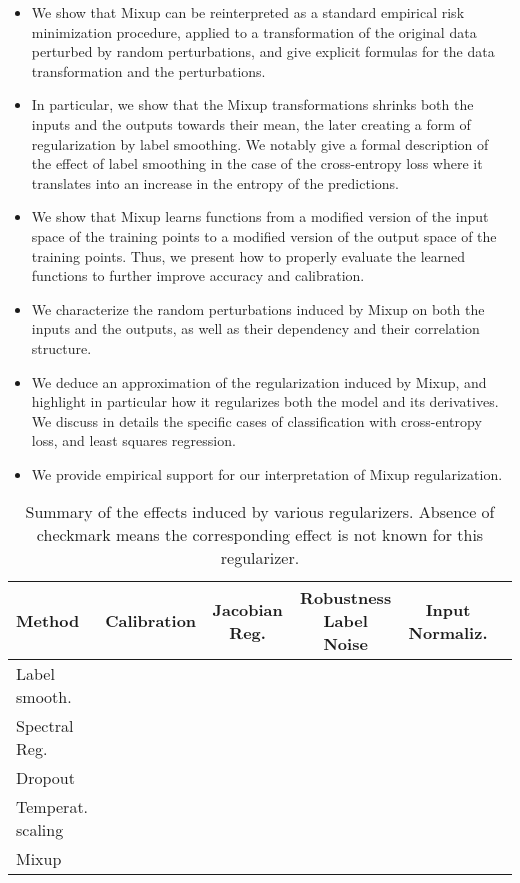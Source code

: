 \documentclass[twoside,11pt]{article}
\newcommand{\nt}[1]{{\bf \color{red} #1}}
\begin{document}
\begin{itemize}\item We show that Mixup can be reinterpreted as a standard empirical risk minimization procedure, applied to a transformation of the original data perturbed by random perturbations, and give explicit formulas for the data transformation and the perturbations.
\item In particular, we show that the Mixup transformations shrinks both the inputs and the outputs towards their mean, the later creating a form of regularization by label smoothing. We notably give a formal description of the effect of label smoothing in the case of the cross-entropy loss where it translates into an increase in the entropy of the predictions.
\item We show that Mixup learns functions from a modified version of the input space of the training points to a modified version of the output space of the training points.
Thus, we present how to properly evaluate the learned functions to further improve accuracy and calibration. 
\item We characterize the random perturbations induced by Mixup on both the inputs and the outputs, as well as their dependency and their correlation structure.
\item We deduce an approximation of the regularization induced by Mixup, and highlight in particular how it regularizes both the model and its derivatives. We discuss in details the specific cases of classification with cross-entropy loss, and least squares regression.
\item We provide empirical support for our interpretation of Mixup regularization.
\end{itemize}


\begin{table}[!htbp]
\begin{center}
\begin{scriptsize}
\setlength\tabcolsep{4pt}
\begin{tabular}{@{}l|c|c|c|c|c|@{}}
\toprule
Method & Calibration  & Jacobian Reg.  & Robustness Label Noise  & Input Normaliz.  \\
\midrule
Label smooth.~\citep{szegedy2016rethinking}       &             &   &     &    \\
Spectral Reg.~\citep{cisse2017parseval}   &           &             &      &\\
Dropout~\citep{wager2013dropout}       &   &    &      &      \\
Temperat. scaling~\citep{guo2017calibration} &    &   &    & \\
Mixup~\citep{Zhang2018mixup} &    &   &      & \\
\bottomrule
\end{tabular}
\end{scriptsize}
\end{center}
\caption{Summary of the effects induced by various regularizers. Absence of checkmark means the corresponding effect is not known for this regularizer. \nt{}}
\label{tab:comparisons}
\end{table}
\end{document}
